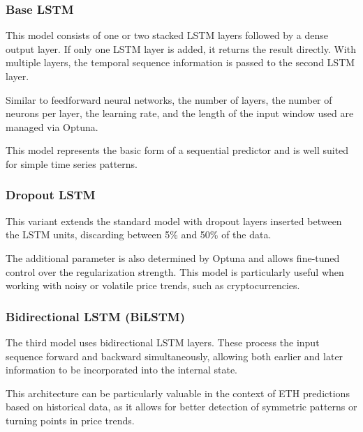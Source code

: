 \subsubsection{Base LSTM}

This model consists of one or two stacked LSTM layers followed by a dense output layer. If only one LSTM layer is added, it returns the result directly. With multiple layers, the temporal sequence information is passed to the second LSTM layer.

Similar to feedforward neural networks, the number of layers, the number of neurons per layer, the learning rate, and the length of the input window used are managed via Optuna.

This model represents the basic form of a sequential predictor and is well suited for simple time series patterns.



\subsubsection{Dropout LSTM}

This variant extends the standard model with dropout layers inserted between the LSTM units, discarding between 5\% and 50\% of the data.

The additional parameter is also determined by Optuna and allows fine-tuned control over the regularization strength. This model is particularly useful when working with noisy or volatile price trends, such as cryptocurrencies.



\subsubsection{Bidirectional LSTM (BiLSTM)}

The third model uses bidirectional LSTM layers. These process the input sequence forward and backward simultaneously, allowing both earlier and later information to be incorporated into the internal state.

This architecture can be particularly valuable in the context of ETH predictions based on historical data, as it allows for better detection of symmetric patterns or turning points in price trends.

